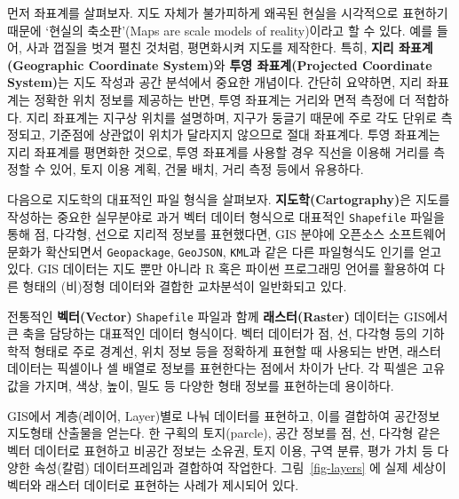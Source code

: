 \documentclass[
  a4paper,showtrims,openright,hidelinks]{oblivoir}
\begin{document}
먼저 좌표계를 살펴보자. 지도 자체가 불가피하게 왜곡된 현실을 시각적으로
표현하기 때문에 `현실의 축소판'(Maps are scale models of reality)이라고
할 수 있다. 예를 들어, 사과 껍질을 벗겨 펼친 것처럼, 평면화시켜 지도를
제작한다. 특히, \textbf{지리 좌표계(Geographic Coordinate System)}와
\textbf{투영 좌표계(Projected Coordinate System)}는 지도 작성과 공간
분석에서 중요한 개념이다. 간단히 요약하면, 지리 좌표계는 정확한 위치
정보를 제공하는 반면, 투영 좌표계는 거리와 면적 측정에 더 적합하다. 지리
좌표계는 지구상 위치를 설명하며, 지구가 둥글기 때문에 주로 각도 단위로
측정되고, 기준점에 상관없이 위치가 달라지지 않으므로 절대 좌표계다. 투영
좌표계는 지리 좌표계를 평면화한 것으로, 투영 좌표계를 사용할 경우 직선을
이용해 거리를 측정할 수 있어, 토지 이용 계획, 건물 배치, 거리 측정
등에서 유용하다. \autocite{lovelace2019geocomputation}

다음으로 지도학의 대표적인 파일 형식을 살펴보자.
\textbf{지도학(Cartography)}은 지도를 작성하는 중요한 실무분야로 과거
벡터 데이터 형식으로 대표적인 \texttt{Shapefile} 파일을 통해 점, 다각형,
선으로 지리적 정보를 표현했다면, GIS 분야에 오픈소스 소프트웨어 문화가
확산되면서 \texttt{Geopackage}, \texttt{GeoJSON}, \texttt{KML}과 같은
다른 파일형식도 인기를 얻고 있다. GIS 데이터는 지도 뿐만 아니라 R 혹은
파이썬 프로그래밍 언어를 활용하여 다른 형태의 (비)정형 데이터와 결합한
교차분석이 일반화되고 있다.

전통적인 \textbf{벡터(Vector)} \texttt{Shapefile} 파일과 함께
\textbf{래스터(Raster)} 데이터는 GIS에서 큰 축을 담당하는 대표적인
데이터 형식이다. 벡터 데이터가 점, 선, 다각형 등의 기하학적 형태로 주로
경계선, 위치 정보 등을 정확하게 표현할 때 사용되는 반면, 래스터 데이터는
픽셀이나 셀 배열로 정보를 표현한다는 점에서 차이가 난다. 각 픽셀은
고유값을 가지며, 색상, 높이, 밀도 등 다양한 형태 정보를 표현하는데
용이하다.

GIS에서 계층(레이어, Layer)별로 나눠 데이터를 표현하고, 이를 결합하여
공간정보 지도형태 산출물을 얻는다. 한 구획의 토지(parcle), 공간 정보를
점, 선, 다각형 같은 벡터 데이터로 표현하고 비공간 정보는 소유권, 토지
이용, 구역 분류, 평가 가치 등 다양한 속성(칼럼) 데이터프레임과 결합하여
작업한다. 그림~\ref{fig-layers} 에 실제 세상이 벡터와 래스터 데이터로
표현하는 사례가 제시되어 있다.
\end{document}
